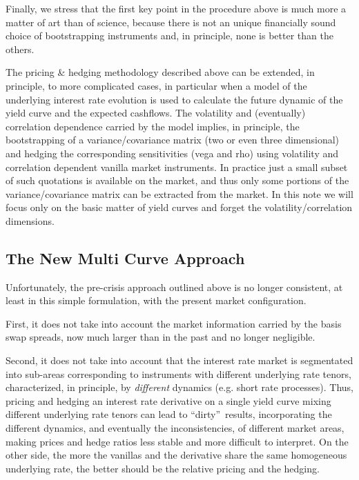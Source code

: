 \documentclass[11pt,reqno]{amsart}
\begin{document}
Finally, we stress that the first key point in the procedure above is much more a matter of art than of science, because there is not an unique financially sound choice of bootstrapping instruments and, in principle, none is better than the others.

The pricing \& hedging methodology described above can be extended, in principle, to more complicated cases, in particular when a model of the underlying interest rate evolution is used to calculate the future dynamic of the yield curve and the expected cashflows. The volatility and (eventually) correlation dependence carried by the model implies, in principle, the bootstrapping of a variance/covariance matrix (two or even three dimensional) and hedging the corresponding sensitivities (vega and rho) using volatility and correlation dependent vanilla market instruments. In practice just a small subset of such quotations is available on the market, and thus only some portions of the variance/covariance matrix can be extracted from the market. In this note we will focus only on the basic matter of yield curves and forget the volatility/correlation dimensions.

\subsection{\label{SecMultiCurve}The New Multi Curve Approach}
Unfortunately, the pre-crisis approach outlined above is no longer consistent, at least in this simple formulation, with the present market configuration.

First, it does not take into account the market information carried by the basis swap spreads, now much larger than in the past and no longer negligible.

Second, it does not take into account that the interest rate market is segmentated into sub-areas corresponding to instruments with different underlying rate tenors, characterized, in principle, by \emph{different} dynamics (e.g. short rate processes). Thus, pricing and hedging an interest rate derivative on a single yield curve mixing different underlying rate tenors can lead to \textquotedblleft dirty\textquotedblright\ results, incorporating the different dynamics, and eventually the inconsistencies, of different market areas, making prices and hedge ratios less stable and more difficult to interpret. On the other side, the more the vanillas and the derivative share the same homogeneous underlying rate, the better should be the relative pricing and the hedging.
\end{document}

